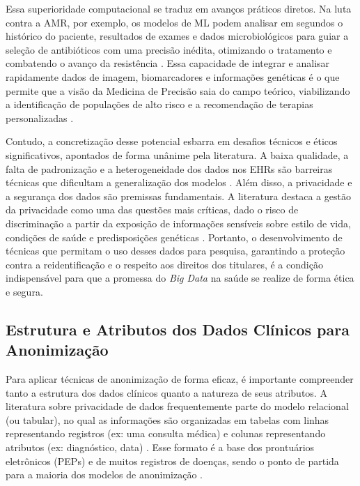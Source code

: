 Essa superioridade computacional se traduz em avanços práticos diretos. Na luta contra a AMR, por exemplo, os modelos de ML podem analisar em segundos o histórico do paciente, resultados de exames e dados microbiológicos para guiar a seleção de antibióticos com uma precisão inédita, otimizando o tratamento e combatendo o avanço da resistência \cite{Pennisi2025}. Essa capacidade de integrar e analisar rapidamente dados de imagem, biomarcadores e informações genéticas é o que permite que a visão da Medicina de Precisão saia do campo teórico, viabilizando a identificação de populações de alto risco e a recomendação de terapias personalizadas \cite{Liu2025, Pennisi2025}.

Contudo, a concretização desse potencial esbarra em desafios técnicos e éticos significativos, apontados de forma unânime pela literatura. A baixa qualidade, a falta de padronização e a heterogeneidade dos dados nos EHRs são barreiras técnicas que dificultam a generalização dos modelos \cite{Liu2025, Pennisi2025}. Além disso, a privacidade e a segurança dos dados são premissas fundamentais. A literatura destaca a gestão da privacidade como uma das questões mais críticas, dado o risco de discriminação a partir da exposição de informações sensíveis sobre estilo de vida, condições de saúde e predisposições genéticas \cite{Belle2015, NationalResearchCouncil2011, Pennisi2025}. Portanto, o desenvolvimento de técnicas que permitam o uso desses dados para pesquisa, garantindo a proteção contra a reidentificação e o respeito aos direitos dos titulares, é a condição indispensável para que a promessa do \textit{Big Data} na saúde se realize de forma ética e segura.

\subsection{Estrutura e Atributos dos Dados Clínicos para Anonimização}
\label{subsec:fund-dados-categorizacao}

Para aplicar técnicas de anonimização de forma eficaz, é importante compreender tanto a estrutura dos dados clínicos quanto a natureza de seus atributos. A literatura sobre privacidade de dados frequentemente parte do modelo relacional (ou tabular), no qual as informações são organizadas em tabelas com linhas representando registros (ex: uma consulta médica) e colunas representando atributos (ex: diagnóstico, data) \cite{Olatunji2024}. Esse formato é a base dos prontuários eletrônicos (PEPs) e de muitos registros de doenças, sendo o ponto de partida para a maioria dos modelos de anonimização \cite{Zuo2021Data}.


